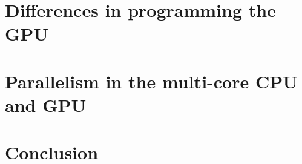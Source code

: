 \documentclass[a4paper,11pt]{article}
\begin{document}


\section{Differences in programming the GPU} %
\label{sec:differences_in_programming_the_gpu}



\section{Parallelism in the multi-core CPU and GPU} %
\label{sec:parallelism_in_the_multi_core_cpu_and_gpu}



\section{Conclusion} %
\label{sec:conclusion}





\end{document}
